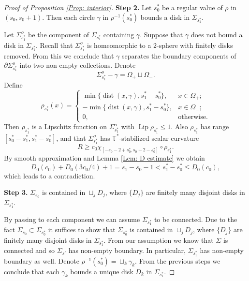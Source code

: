 \documentclass[11pt, reqno]{amsart}
\numberwithin{equation}{section}
\theoremstyle{definition}
\DeclareMathOperator{\Lip}{Lip}
\DeclareMathOperator{\dist}{dist}
\begin{document}
\begin{proof}[Proof of Proposition \ref{Prop: interior}]
\medskip

\noindent
{\bf Step 2.} Let $s_0^*$ be a regular value of $\rho$ in $(s_0,s_0+1)$. Then each circle $\gamma$ in $\rho^{-1}(s_0^*)$ bounds a disk in $\Sigma_{s_{1}^{*}}$.

\medskip

Let $\Sigma_{s_1^*}^o$ be the component of $\Sigma_{s_1^*}$ containing $\gamma$. Suppose that $\gamma$ does not bound a disk in $\Sigma_{s_1^*}$. Recall that $\Sigma_{s_1^*}^{o}$ is homeomorphic to a $2$-sphere with finitely disks removed. From this we conclude that $\gamma$ separates the boundary components of $\partial\Sigma_{s_1^*}^o$ into two non-empty collections. Denote
$$\Sigma_{s_1^*}^o-\gamma=\Omega_+\sqcup \Omega_-.$$
Define
\begin{equation*}
\rho_{s_1^*}(x)=\left\{
\begin{array}{cc}
\min\{\dist(x,\gamma), s_1^*-s_0^*\},& x\in \Omega_+;\\[1mm]
-\min\{\dist(x,\gamma), s_1^*-s_0^*\},& x\in \Omega_-;\\[1mm]
0,&\mbox{otherwise}.
\end{array}\right.
\end{equation*}
Then $\rho_{s_1^*}$ is a Lipschitz function on $\Sigma_{s_1^*}^o$ with $\Lip \rho_{s_1^*}\leq1$. Also $\rho_{s_1^*}$ has range $[s_0^*-s_1^*,s_1^*-s_0^*]$, and that $\Sigma_{s_1^*}^o$ has $\mathbb{T}^*$-stabilized scalar curvature $$R\geq c_0\chi_{[-s_0-2+s_0^*,s_0+2-s_0^*]}\circ \rho_{s_1^*}.$$
By smooth approximation and Lemma \ref{Lem: D estimate} we obtain
$$
D_0(c_0)+D_0(3c_0/4)+1 = s_{1}-s_{0}-1 < s_1^*-s_0^*\leq D_0(c_0),
$$
which leads to a contradiction.

\medskip

\noindent
{\bf Step 3.} $\Sigma_{s_0}$ is contained in $\sqcup_j D_j$, where $\{D_j\}$ are finitely many disjoint disks in $\Sigma_{s_1^*}$.

\medskip

By passing to each component we can assume $\Sigma_{s_1^*}$ to be connected. Due to the fact $\Sigma_{s_0}\subset \Sigma_{s_0^*}$ it suffices to show that $\Sigma_{s_0^*}$ is contained in $\sqcup_j D_j$, where $\{D_j\}$ are finitely many disjoint disks in $\Sigma_{s_1^*}$. From our assumption we know that $\Sigma$ is connected and so $\Sigma_{s'}$ has non-empty boundary. In particular, $\Sigma_{s_1^*}$ has non-empty boundary as well. Denote $\rho^{-1}(s_0^*)=\sqcup_k\gamma_k$. From the previous steps we conclude that each $\gamma_k$ bounds a unique disk $D_k$ in $\Sigma_{s_1^*}$.


\end{proof}
\end{document}
